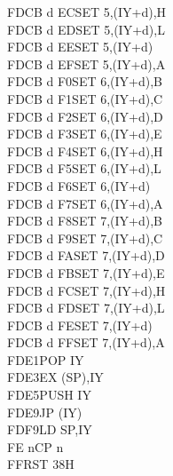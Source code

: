 \begin{multicols}{3}
{\begin{tabbing}
	FDCB d EC\>SET 5,(IY+d),H\UNDOC\\
	FDCB d ED\>SET 5,(IY+d),L\UNDOC\\
	FDCB d EE\>SET 5,(IY+d)\\
	FDCB d EF\>SET 5,(IY+d),A\UNDOC\\
	FDCB d F0\>SET 6,(IY+d),B\UNDOC\\
	FDCB d F1\>SET 6,(IY+d),C\UNDOC\\
	FDCB d F2\>SET 6,(IY+d),D\UNDOC\\
	FDCB d F3\>SET 6,(IY+d),E\UNDOC\\
	FDCB d F4\>SET 6,(IY+d),H\UNDOC\\
	FDCB d F5\>SET 6,(IY+d),L\UNDOC\\
	FDCB d F6\>SET 6,(IY+d)\\
	FDCB d F7\>SET 6,(IY+d),A\UNDOC\\
	FDCB d F8\>SET 7,(IY+d),B\UNDOC\\
	FDCB d F9\>SET 7,(IY+d),C\UNDOC\\
	FDCB d FA\>SET 7,(IY+d),D\UNDOC\\
	FDCB d FB\>SET 7,(IY+d),E\UNDOC\\
	FDCB d FC\>SET 7,(IY+d),H\UNDOC\\
	FDCB d FD\>SET 7,(IY+d),L\UNDOC\\
	FDCB d FE\>SET 7,(IY+d)\\
	FDCB d FF\>SET 7,(IY+d),A\UNDOC\\
	FDE1\>POP IY\\
	FDE3\>EX (SP),IY\\
	FDE5\>PUSH IY\\
	FDE9\>JP (IY)\\
	FDF9\>LD SP,IY\\
	FE n\>CP n\\
	FF\>RST 38H
\end{tabbing}
}
\end{multicols}
\normalsize

\pagebreak
\IntentionallyEmpty
\pagebreak
